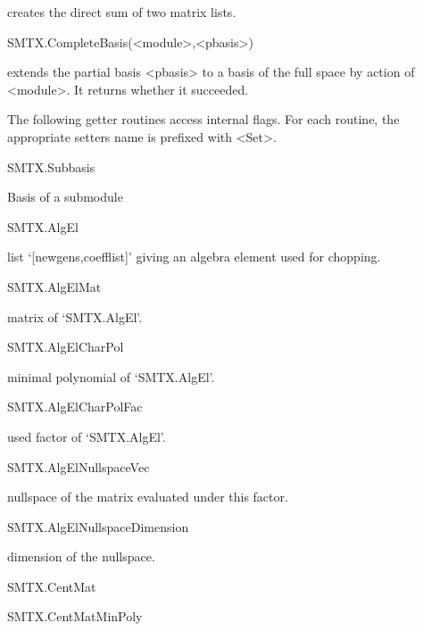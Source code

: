 creates the direct sum of two matrix lists.

\>SMTX.CompleteBasis(<module>,<pbasis>)

extends the partial basis <pbasis> to a basis of the full space
by action of <module>. It returns whether it succeeded.


The following getter routines access internal flags. For each routine, the
appropriate setters name is prefixed with <Set>.

\>SMTX.Subbasis

Basis of a submodule

\>SMTX.AlgEl

list `[newgens,coefflist]' giving an algebra element used for chopping.

\>SMTX.AlgElMat

matrix of `SMTX.AlgEl'.

\>SMTX.AlgElCharPol

minimal polynomial of `SMTX.AlgEl'.

\>SMTX.AlgElCharPolFac

used factor of `SMTX.AlgEl'.

\>SMTX.AlgElNullspaceVec

nullspace of the matrix evaluated under this factor.

\>SMTX.AlgElNullspaceDimension

dimension of the nullspace.

\>SMTX.CentMat


\>SMTX.CentMatMinPoly


